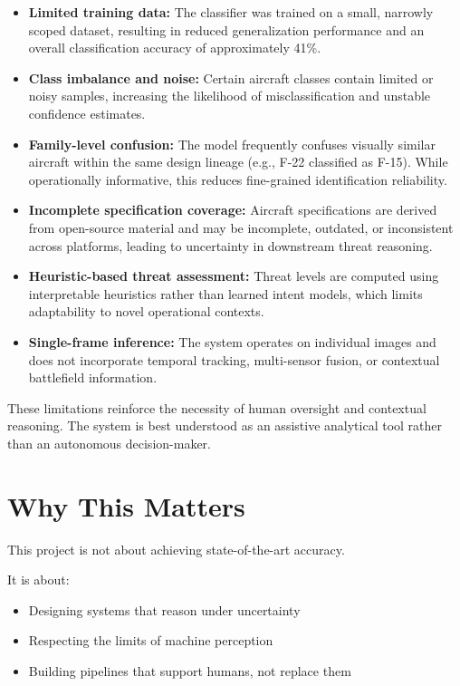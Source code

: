 \documentclass[11pt]{article}
\begin{document}
\begin{itemize}
    \item \textbf{Limited training data:} The classifier was trained on a small, narrowly scoped dataset, resulting in reduced generalization performance and an overall classification accuracy of approximately 41\%.
    
    \item \textbf{Class imbalance and noise:} Certain aircraft classes contain limited or noisy samples, increasing the likelihood of misclassification and unstable confidence estimates.
    
    \item \textbf{Family-level confusion:} The model frequently confuses visually similar aircraft within the same design lineage (e.g., F-22 classified as F-15). While operationally informative, this reduces fine-grained identification reliability.
    
    \item \textbf{Incomplete specification coverage:} Aircraft specifications are derived from open-source material and may be incomplete, outdated, or inconsistent across platforms, leading to uncertainty in downstream threat reasoning.
    
    \item \textbf{Heuristic-based threat assessment:} Threat levels are computed using interpretable heuristics rather than learned intent models, which limits adaptability to novel operational contexts.
    
    \item \textbf{Single-frame inference:} The system operates on individual images and does not incorporate temporal tracking, multi-sensor fusion, or contextual battlefield information.
\end{itemize}

These limitations reinforce the necessity of human oversight and contextual reasoning. The system is best understood as an assistive analytical tool rather than an autonomous decision-maker.


\section*{Why This Matters}

This project is not about achieving state-of-the-art accuracy.

It is about:
\begin{itemize}
    \item Designing systems that reason under uncertainty
    \item Respecting the limits of machine perception
    \item Building pipelines that support humans, not replace them
\end{itemize}
\end{document}
